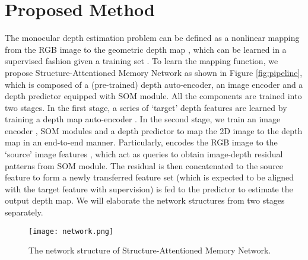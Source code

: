 \documentclass[letterpaper]{article} \usepackage{aaai20}  \usepackage{times}  \usepackage{helvet} \usepackage{courier}  \usepackage{graphicx} \frenchspacing  \setlength{\pdfpagewidth}{8.5in}  \setlength{\pdfpageheight}{11in}  \usepackage{epsfig}
\begin{document}
    \section{Proposed Method}
    \label{sec:proposed}
     The monocular depth estimation problem can be defined as a nonlinear mapping  from the RGB image  to the geometric depth map , which can be learned in a supervised fashion given a training set . To learn the mapping function, we propose Structure-Attentioned Memory Network as shown in Figure \ref{fig:pipeline}, which is composed of a (pre-trained) depth auto-encoder, an image encoder and a depth predictor equipped with SOM module. All the components are trained into two stages. In the first stage, a series of `target' depth features  are learned by training a depth map auto-encoder . In the second stage, we train an image encoder , SOM modules  and a depth predictor  to map the 2D image to the depth map in an end-to-end manner. Particularly,  encodes the RGB image to the `source' image features , which act as queries to obtain image-depth residual patterns from SOM module. The residual is then concatenated to the source feature to form a newly transferred feature set  (which is expected to be aligned with the target feature  with supervision) is fed to the predictor  to estimate the output depth map. We will elaborate the network structures  from two stages separately. 
    \begin{figure*}[t]
    \begin{center}
       \texttt{[image: network.png]}
    \end{center}
    \vspace{-13pt}
       \caption{The network structure of Structure-Attentioned Memory Network.}
       \vspace{-10pt}
    \label{fig:network}
    \end{figure*}
    
\end{document}
